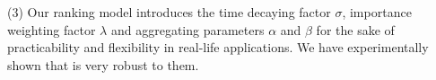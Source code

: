 


\noindent(3) Our ranking model \ensemblerank introduces the time decaying factor $\sigma$, importance weighting factor $\lambda$ and aggregating parameters $\alpha$ and $\beta$ for the sake of practicability and flexibility in real-life applications. We have experimentally shown that \ensemblerank is very robust to them.


